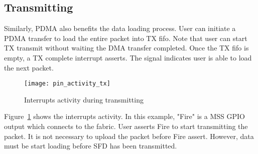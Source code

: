 \subsection{Transmitting}
Similarly, PDMA also benefits the data loading process. User can initiate a PDMA transfer to
load the entire packet into TX fifo. Note that user can start TX transmit without waiting
the DMA transfer completed. Once the TX fifo is empty, a TX complete interrupt asserts.
The signal indicates user is able to load the next packet.
\begin{figure}[h]
\centering
	\texttt{[image: pin\_activity\_tx]}
	\caption{Interrupts activity during transmitting}
	\label{fig:pin_activity_tx}
\end{figure}
Figure~\ref{fig:pin_activity_tx} shows the interrupts activity. In this example, "Fire" is a MSS GPIO
output which connects to the fabric. User asserts Fire to start transmitting the packet. It is not necessary
to upload the packet before Fire assert. However, data must be start loading before SFD has been transmitted.

\begin{table}[h]
\centering
	\begin{tabular}{|c|c|}
	\end{tabular}
\end{table}
